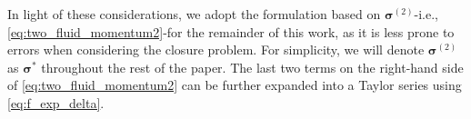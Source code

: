In light of these considerations, we adopt the formulation based on $\bm \sigma^{(2)}$-i.e., \ref{eq:two_fluid_momentum2}-for the remainder of this work, as it is less prone to errors when considering the closure problem. 
For simplicity, we will denote $\bm \sigma^{(2)}$ as $\bm \sigma^{*}$ throughout the rest of the paper.
The last two terms on the right-hand side of \ref{eq:two_fluid_momentum2} can be further expanded into a Taylor series using \ref{eq:f_exp_delta}.
